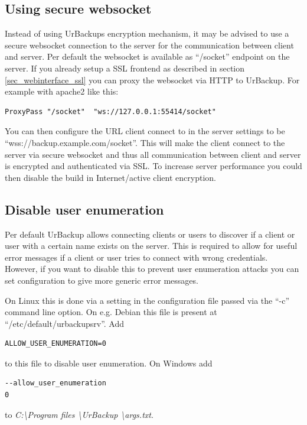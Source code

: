 \documentclass[a4paper,10pt]{article}
\begin{document}
\subsection{Using secure websocket}

Instead of using UrBackups encryption mechanism, it may be advised to use a secure websocket connection to the server for the communication between client and server. Per default the websocket is available as ``/socket'' endpoint on the server. If you already setup a SSL frontend as described in section \ref{sec_webinterface_ssl} you can proxy the websocket via HTTP to UrBackup. For example with apache2 like this:

\begin{verbatim}
ProxyPass "/socket"  "ws://127.0.0.1:55414/socket"
\end{verbatim}

You can then configure the URL client connect to in the server settings to be ``wss://backup.example.com/socket''. This will make the client connect to the server via secure websocket and thus all communication between client and server is encrypted and authenticated via SSL.
To increase server performance you could then disable the build in Internet/active client encryption.

\subsection{Disable user enumeration}

Per default UrBackup allows connecting clients or users to discover if a client or user with a certain name exists on the server. This is required to allow for useful error messages if a client or user tries to connect with wrong credentials. However, if you want to disable this to prevent user enumeration attacks you can set configuration to give more generic error messages.

On Linux this is done via a setting in the configuration file passed via the ``-c'' command line option. On e.g. Debian this file is present at ``/etc/default/urbackupsrv''. Add
\begin{verbatim}
ALLOW_USER_ENUMERATION=0
\end{verbatim}
to this file to disable user enumeration. On Windows add 
\begin{verbatim}
--allow_user_enumeration
0
\end{verbatim}
to \textsl{C:\textbackslash Program files \textbackslash UrBackup \textbackslash args.txt}.
\end{document}
